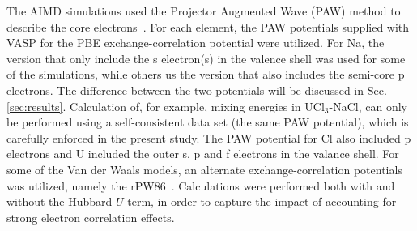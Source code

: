 \documentclass[preprint,3p,10pt,twocolumn,number,sort&compress]{elsarticle}
\begin{document}
The AIMD simulations used the Projector Augmented Wave (PAW) method to describe the core electrons~\cite{}. For each element, the PAW potentials supplied with VASP for the PBE exchange-correlation potential were utilized. For Na, the version that only include the s electron(s)  in the valence shell was used for some of the simulations, while others us the version that also includes the semi-core p electrons. The difference between the two potentials will be discussed in Sec. \ref{sec:results}. Calculation of, for example, mixing energies in UCl$_3$-NaCl, can only be performed using a self-consistent data set (the same PAW potential), which is carefully enforced in the present study. The PAW potential for Cl also included p electrons and U included the outer s, p and f electrons in the valance shell. For some of the Van der Waals models, an alternate exchange-correlation potentials was utilized, namely the rPW86~\cite{}. Calculations were performed both with and without the Hubbard $U$ term, in order to capture the impact of accounting for strong electron correlation effects.
\end{document}
